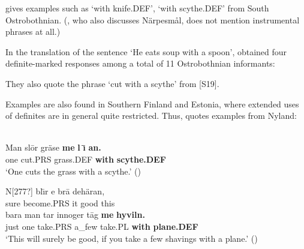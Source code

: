 \citet{Ivars2005} gives examples such as  ‘with knife.DEF’,   ‘with scythe.DEF’ from South Ostrobothnian. (\citet{Nikula1997}, who also discusses Närpesmål, does not mention instrumental phrases at all.)

In the translation of the sentence ‘He eats soup with a spoon’, \citet{ErikssonEtAl1999} obtained four definite-marked responses among a total of 11 Ostrobothnian informants:

\ea 
	\z 
\z

They also quote the phrase  ‘cut with a scythe’ from [S19]. 

Examples are also found in Southern Finland and Estonia, where extended uses of definites are in general quite restricted. Thus, \citet{Lundström1939} quotes examples from Nyland:

\ea\label{}
\\
\gll Man  sl\=or  gräse  \textbf{me} \textbf{l} \textbf{\={\i}} \textbf{an.}\\
one  cut.PRS  grass.DEF  \textbf{with} \textbf{scythe.DEF}\\
\glt ‘One cuts the grass with a scythe.’ (\citet[15]{Lundström1939})

\z

\ea
\gll N[277?]  bl\={\i}r  e  br\=a  dehäran,\\
sure  become.PRS  it  good  this\\
\gll bara  man  tar  innoger  t\=ag  \textbf{me} \textbf{hyviln.}\\
just  one  take.PRS  a\_few  take.PL  \textbf{with} \textbf{plane.DEF}\\
\glt ‘This will surely be good, if you take a few shavings with a plane.’ (\citet[15]{Lundström1939})

